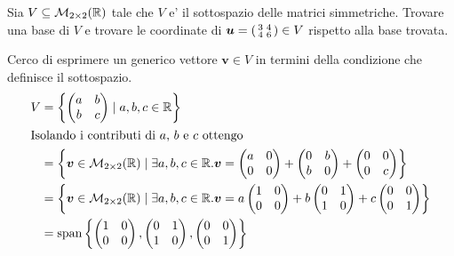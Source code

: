 \begin{example}
    Sia $V \subseteq \mathcal{M}_{2 \times 2}(\mathbb{R})$ tale che $V$ e' il sottospazio delle matrici simmetriche. Trovare una base di $V$ e trovare le coordinate di $\bm{u} = \begin{psmallmatrix}
        3 & 4 \\ 4 & 6
    \end{psmallmatrix} \in V$ rispetto alla base trovata.
\end{example}
\begin{solution}
    Cerco di esprimere un generico vettore $\bm{v} \in V$ in termini della condizione che definisce il sottospazio.
    \begin{alignat*}
        {1}
        V &= \left\{ \begin{pmatrix} a&b\\b&c \end{pmatrix}\mid a, b, c \in \mathbb{R}\right\} \\
        \intertext{Isolando i contributi di $a$, $b$ e $c$ ottengo}
        &= \left\{ \bm{v} \in \mathcal{M}_{2 \times 2}(\mathbb{R}) \mid \exists a, b, c \in \mathbb{R}. \bm{v} = \begin{pmatrix} a&0\\0&0 \end{pmatrix} + \begin{pmatrix} 0&b\\b&0 \end{pmatrix} + \begin{pmatrix} 0&0\\0&c \end{pmatrix}\right\} \\
        &= \left\{ \bm{v} \in \mathcal{M}_{2 \times 2}(\mathbb{R}) \mid \exists a, b, c \in \mathbb{R}. \bm{v} = a\begin{pmatrix} 1&0\\0&0 \end{pmatrix} + b\begin{pmatrix} 0&1\\1&0 \end{pmatrix} + c\begin{pmatrix} 0&0\\0&1 \end{pmatrix}\right\} \\
        &= \operatorname{span}\left\{\begin{pmatrix} 1&0\\0&0 \end{pmatrix}, \begin{pmatrix} 0&1\\1&0 \end{pmatrix}, \begin{pmatrix} 0&0\\0&1 \end{pmatrix}\right\} \\
    \end{alignat*}


\end{solution}
